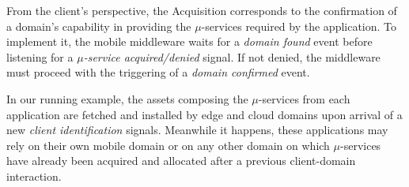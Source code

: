 
%
%	
%	
%	


From the client's perspective, the Acquisition corresponds to the confirmation of a domain's capability in providing the $\mu$-services required by the application. To implement it, the mobile middleware waits for a \textit{domain found} event before listening for a \textit{$\mu$-service acquired/denied} signal. If not denied, the middleware must proceed with the triggering of a \textit{domain confirmed} event.


In our running example, the assets composing the $\mu$-services from each application are fetched and installed by edge and cloud domains upon arrival of a new \textit{client identification} signals. Meanwhile it happens, these applications may rely on their own mobile domain or on any other domain on which $\mu$-services have already been acquired and allocated after a previous client-domain interaction.

